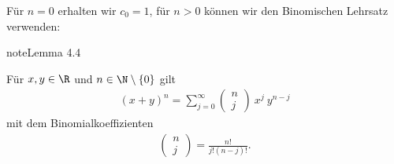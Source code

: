 \documentclass[letterpaper,10pt,english]{jupyterBook}
\begin{document}
Für \(n=0\) erhalten wir \(c_0 =1\), für \(n > 0\) können wir den Binomischen Lehrsatz verwenden:
\label{metrik/potenzreihen:lemma-3}
\begin{sphinxadmonition}{note}{Lemma 4.4}



Für \(x,y \in \R\) und \(n \in \N\setminus\{0\}\) gilt
\begin{equation*}
\begin{split} (x+y)^n = \sum_{j=0}^\infty (\begin{matrix} n\\j \end{matrix} ) ~  x^j~ y^{n-j}\end{split}
\end{equation*}
mit dem Binomialkoeffizienten
\begin{equation*}
\begin{split}  (\begin{matrix} n\\j \end{matrix} ) = \frac{n!}{j! (n-j)!}.\end{split}
\end{equation*}\end{sphinxadmonition}
\end{document}
